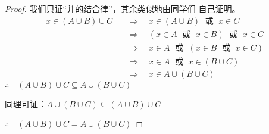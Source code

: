 \begin{proof}
    我们只证“并的结合律”，其余类似地由同学们
    自己证明。
\[\begin{split}
     x\in (A\cup B)\cup C &\quad \Rightarrow \quad x\in (A\cup B)\; \text{ 或 }\;  x\in C\\
     &\quad \Rightarrow \quad  (x\in A \; \text{ 或 }\;  x\in B)\; \text{ 或 }\;  x\in C  \\
     &\quad \Rightarrow \quad   x\in A\; \text{ 或 }\;  (x\in B\; \text{ 或 }\;  x\in C) \\
     &\quad \Rightarrow \quad  x\in A\; \text{ 或 }\;  x\in (B\cup C) \\
     &\quad \Rightarrow \quad  x\in A\cup (B\cup C)  
\end{split}\]
$\therefore\quad (A\cup B)\cup C\subseteq A\cup (B\cup C)$

同理可证：$A\cup (B\cup C)\subseteq (A\cup B)\cup C$

$\therefore\quad (A\cup B)\cup C=A\cup (B\cup C)$
\end{proof}





\begin{example}
  
\end{example}

\begin{example}
  
\end{example}

\begin{example}
  
\end{example}

\begin{solution}
  
\end{solution}

\begin{example}
  
\end{example}

\begin{solution}
  
\end{solution}

\begin{example}

  
\end{example}


\begin{solution}
  
\end{solution}



